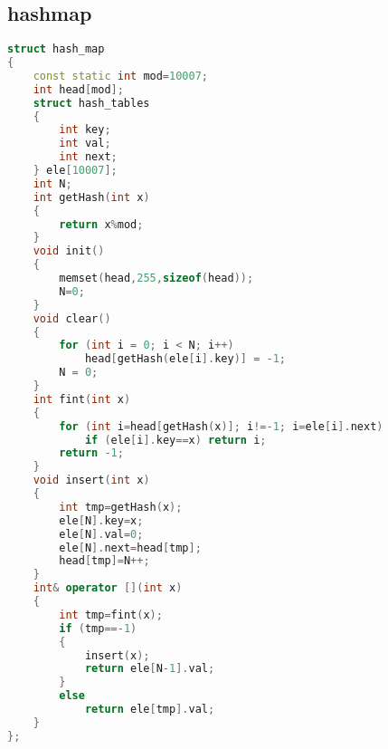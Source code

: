 \subsection{hashmap}
    \begin{lstlisting}[language=c++]
struct hash_map
{
    const static int mod=10007;
    int head[mod];
    struct hash_tables
    {
        int key;
        int val;
        int next;
    } ele[10007];
    int N;
    int getHash(int x)
    {
        return x%mod;
    }
    void init()
    {
        memset(head,255,sizeof(head));
        N=0;
    }
    void clear()
    {
        for (int i = 0; i < N; i++)
            head[getHash(ele[i].key)] = -1;
        N = 0;
    }
    int fint(int x)
    {
        for (int i=head[getHash(x)]; i!=-1; i=ele[i].next)
            if (ele[i].key==x) return i;
        return -1;
    }
    void insert(int x)
    {
        int tmp=getHash(x);
        ele[N].key=x;
        ele[N].val=0;
        ele[N].next=head[tmp];
        head[tmp]=N++;
    }
    int& operator [](int x)
    {
        int tmp=fint(x);
        if (tmp==-1)
        {
            insert(x);
            return ele[N-1].val;
        }
        else
            return ele[tmp].val;
    }
};
    \end{lstlisting}
